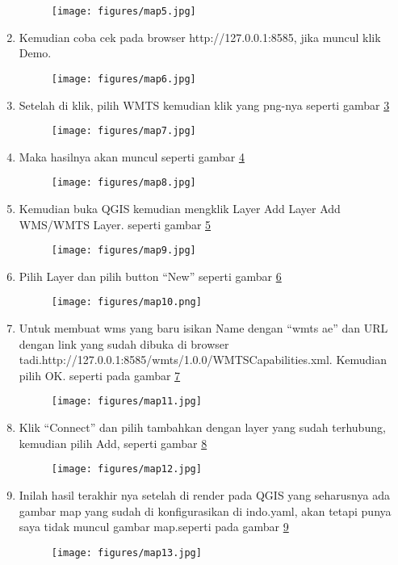 \begin{enumerate}
\begin{figure}[!htbp]
    \centering
    \texttt{[image: figures/map5.jpg]}
    \label{map5}
\end{figure}
    \item Kemudian coba cek pada browser http://127.0.0.1:8585, jika muncul klik Demo.
\begin{figure}[!htbp]
    \centering
    \texttt{[image: figures/map6.jpg]}
    \label{map6}
\end{figure}
    \item Setelah di klik, pilih WMTS kemudian klik yang png-nya seperti gambar \ref{map7}
\begin{figure}[!htbp]
    \centering
    \texttt{[image: figures/map7.jpg]}
    \label{map7}
\end{figure}
    \item Maka hasilnya akan muncul seperti gambar \ref{map8}
\begin{figure}[!htbp]
    \centering
    \texttt{[image: figures/map8.jpg]}
    \label{map8}
\end{figure}
    \item Kemudian buka QGIS kemudian mengklik Layer Add Layer Add WMS/WMTS Layer. seperti gambar \ref{map9}
\begin{figure}[!htbp]
    \centering
    \texttt{[image: figures/map9.jpg]}
    \label{map9}
\end{figure}
    \item Pilih Layer dan pilih button “New” seperti gambar \ref{map10}
\begin{figure}[!htbp]
    \centering
    \texttt{[image: figures/map10.png]}
    \label{map10}
\end{figure}
    \item Untuk membuat wms yang baru isikan Name dengan “wmts ae” dan URL dengan link yang sudah dibuka di browser tadi.http://127.0.0.1:8585/wmts/1.0.0/WMTSCapabilities.xml. Kemudian pilih OK. seperti pada gambar \ref{map11}
\begin{figure}[!htbp]
    \centering
    \texttt{[image: figures/map11.jpg]}
    \label{map11}
\end{figure}
    \item Klik “Connect” dan pilih tambahkan dengan layer yang sudah terhubung, kemudian pilih Add, seperti gambar \ref{map12}
\begin{figure}[!htbp]
    \centering
    \texttt{[image: figures/map12.jpg]}
    \label{map12}
\end{figure}
    \item Inilah hasil terakhir nya setelah di render pada QGIS yang seharusnya ada gambar map yang sudah di konfigurasikan di indo.yaml, akan tetapi punya saya tidak muncul gambar map.seperti pada gambar \ref{map13}
\begin{figure}[!htbp]
    \centering
    \texttt{[image: figures/map13.jpg]}
    \label{map13}
\end{figure}


\end{enumerate}

